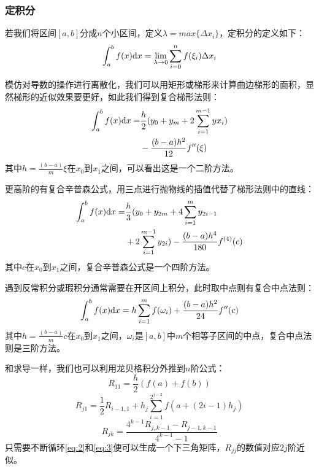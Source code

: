 \documentclass[UTF8,a4paper,10pt]{ctexart}
\begin{document}
\begin{multicols}{2}
            \subsubsection{定积分}
            若我们将区间$[a,b]$分成$n$个小区间，定义$\lambda = max\{\Delta x_i\}$，定积分的定义如下：
            \begin{equation}
                \int_{a}^{b}f(x){\rm d}x = \lim_{\lambda\to 0}\sum_{i=0}^{n}f(\xi_i)\Delta x_i
            \end{equation}\par
            模仿对导数的操作进行离散化，我们可以用矩形或梯形来计算曲边梯形的面积，显然梯形的近似效果要更好，如此我们得到复合梯形法则：
            \begin{equation}
                \begin{split}
                    \int_a^b f(x){\rm d}x = &\frac{h}{2}(y_0+y_m+2\sum_{i=1}^{m-1}yx_i)\\
                    &-\frac{(b-a)h^2}{12}f''(\xi)
                \end{split}
            \end{equation}
            其中$h = \frac{(b-a)}{m}$$\xi$在$x_0$到$x_1$之间，可以看出这是一个二阶方法。\par
            更高阶的有复合辛普森公式，用三点进行抛物线的插值代替了梯形法则中的直线：
            \begin{equation}
                \begin{split}
                    \int_a^b f(x){\rm d}x = &\frac{h}{3}(y_0+y_{2m}+4\sum_{i=1}^{m}y_{2i-1}\\
                    &+2\sum_{i=1}^{m-1}y_{2i})-\frac{(b-a)h^4}{180}f^{(4)}(c)
                \end{split}
            \end{equation}
            其中$c$在$x_0$到$x_1$之间，复合辛普森公式是一个四阶方法。\par
            遇到反常积分或瑕积分通常需要在开区间上积分，此时取中点则有复合中点法则：
            \begin{equation}
                \int_a^b f(x){\rm d}x = h\sum_{i=1}^{m}f(\omega_i)+\frac{(b-a)h^2}{24}f''(c)
            \end{equation}
            其中$h = \frac{(b-a)}{m}$$c$在$x_0$到$x_1$之间，$\omega_i$是$[a,b]$中$m$个相等子区间的中点，复合中点法则是三阶方法。\par
            和求导一样，我们也可以利用龙贝格积分外推到$n$阶公式：
            \begin{equation}
                R_{11} = \frac{h}{2}(f(a)+f(b))
            \end{equation}
            \begin{equation}\label{eq:2}
                R_{j1} = \frac{1}{2}R_{i-1,1} + h_j\sum_{i=1}^{2^{j-2}}f(a+(2i-1)h_j)
            \end{equation}
            \begin{equation}\label{eq:3}
                R_{jk} = \frac{4^{k-1}R_{j,k-1}-R_{j-1,k-1}}{4^{k-1}-1}
            \end{equation}
            只需要不断循环\eqref{eq:2}和\eqref{eq:3}便可以生成一个下三角矩阵，$R_{jj}$的数值对应$2j$阶近似。

\end{multicols}
\end{document}
